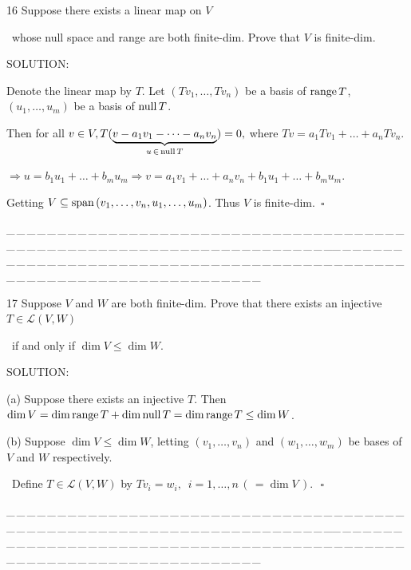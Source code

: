 \documentclass[a4paper, 11pt, UTF8]{article}
\def\range{\textup{range}\,}
\def\null{\textup{null\,}}
\def\Spn{\textup{span}\,}
\def\Lm{\mathcal{L}}
\begin{document}
\begin{large}
{\timesbf\Large 16} {\timessl\Large 
Suppose there exists a linear map on $V$}\par\quad\,
{\timessl\Large whose null space and range are both
finite-dim. Prove that $V$ is finite-dim.
}\par
{\timesbf S\footnotesize{OLUTION:}}\par\quad
Denote the linear map by $T$. Let $(Tv_1,\dots,Tv_n)$ be a basis of $\range T$, $(u_1,\dots,u_m)$ be a basis of $\null T$.\par\quad
Then for all $v\in V,T(\underbrace{v-a_1 v_1-\dots-a_n v_n}_{u\,\in\,\null T})=0,$ where $Tv=a_1 Tv_1+\dots+a_n Tv_n.$\par\quad
$\Rightarrow u=b_1 u_1+\dots+b_m u_m\Rightarrow v=a_1 v_1+\dots+a_n v_n+b_1 u_1+\dots+b_m u_m.$\par\quad
Getting $V\subseteq\Spn(v_1,\dots,v_n,u_1,\dots,u_m)$. Thus $V$ is finite-dim.$\,\,\,\square$\par
{\tiny \_\,\_\,\_\,\_\,\_\,\_\,\_\,\_\,\_\,\_\,\_\,\_\,\_\,\_\,\_\,\_\,\_\,\_\,\_\,\_\,\_\,\_\,\_\,\_\,\_\,\_\,\_\,\_\,\_\,\_\,\_\,\_\,\_\,\_\,\_\,\_\,\_\,\_\,\_\,\_\,\_\,\_\,\_\,\_\,\_\,\_\,\_\,\_\,\_\,\_\,\_\,\_\,\_\,\_\,\_\,\_\,\_\,\_\,\_\,\_\,\_\,\_\,\_\,\_\,\_\,\_\,\_\,\_\,\_\,\_\,\_\_\,\_\,\_\,\_\,\_\,\_\,\_\,\_\,\_\,\_\,\_\,\_\,\_\,\_\,\_\,\_\,\_\,\_\,\_\,\_\,\_\,\_\,\_\,\_\,\_\,\_\,\_\,\_\,\_\,\_\,\_\,\_\,\_\,\_\,\_\,\_\,\_\,\_\,\_\,\_\,\_\,\_\,\_\,\_\,\_\,\_\,\_\,\_\,\_\,\_\,\_\,\_\,\_\,\_\,\_\,\_\,\_\,\_\,\_\,\_\,\_\,\_\,\_\,\_\,\_\,\_\,\_\,\_\,\_\,\_\,\_}\par

{\timesbf\Large 17} {\timessl\Large 
Suppose $V$ and $W$ are both finite-dim. Prove that there exists an injective $T\in\Lm(V,W)$}\par\quad\,
{\timessl\Large if and only if $\dim V\leq\dim W$.
}\par
{\timesbf S\footnotesize{OLUTION:}}\par\quad
(a) Suppose there exists an injective $T$. Then $\dim V=\dim\range T+\dim\null T=\dim\range T\leq\dim W$.\par\quad
(b) Suppose $\dim V\leq\dim W$, letting $(v_1,\dots,v_n)$ and $(w_1,\dots,w_m)$ be bases of $V$ and $W$ respectively.\par\qquad\, Define $T\in\Lm(V,W)$ by $Tv_i=w_i,\,\,\,i=1,\dots,n\,(\,=\dim V\,).\,\,\,\,\square$\par
{\tiny \_\,\_\,\_\,\_\,\_\,\_\,\_\,\_\,\_\,\_\,\_\,\_\,\_\,\_\,\_\,\_\,\_\,\_\,\_\,\_\,\_\,\_\,\_\,\_\,\_\,\_\,\_\,\_\,\_\,\_\,\_\,\_\,\_\,\_\,\_\,\_\,\_\,\_\,\_\,\_\,\_\,\_\,\_\,\_\,\_\,\_\,\_\,\_\,\_\,\_\,\_\,\_\,\_\,\_\,\_\,\_\,\_\,\_\,\_\,\_\,\_\,\_\,\_\,\_\,\_\,\_\,\_\,\_\,\_\,\_\,\_\_\,\_\,\_\,\_\,\_\,\_\,\_\,\_\,\_\,\_\,\_\,\_\,\_\,\_\,\_\,\_\,\_\,\_\,\_\,\_\,\_\,\_\,\_\,\_\,\_\,\_\,\_\,\_\,\_\,\_\,\_\,\_\,\_\,\_\,\_\,\_\,\_\,\_\,\_\,\_\,\_\,\_\,\_\,\_\,\_\,\_\,\_\,\_\,\_\,\_\,\_\,\_\,\_\,\_\,\_\,\_\,\_\,\_\,\_\,\_\,\_\,\_\,\_\,\_\,\_\,\_\,\_\,\_\,\_\,\_\,\_}\par


\end{large}
\end{document}
